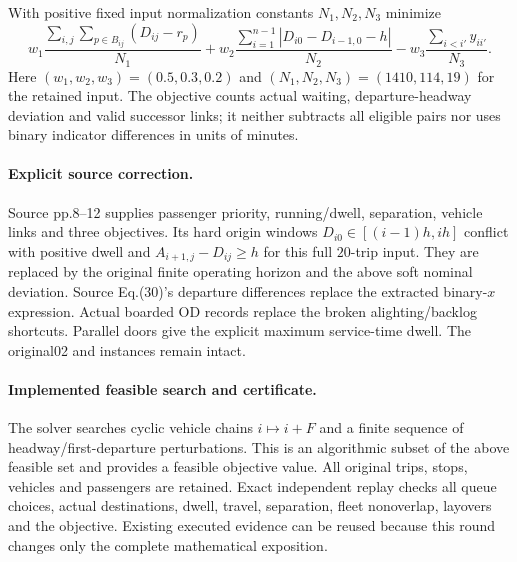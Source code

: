\documentclass[11pt]{article}
\begin{document}
With positive fixed input normalization constants $N_1,N_2,N_3$ minimize
\[
 w_1\frac{\sum_{i,j}\sum_{p\in B_{ij}}(D_{ij}-r_p)}{N_1}
 +w_2\frac{\sum_{i=1}^{n-1}|D_{i0}-D_{i-1,0}-h|}{N_2}
 -w_3\frac{\sum_{i<i'}y_{ii'}}{N_3}.
\]
Here $(w_1,w_2,w_3)=(0.5,0.3,0.2)$ and
$(N_1,N_2,N_3)=(1410,114,19)$ for the retained input.
The objective counts actual waiting, departure-headway deviation and valid
successor links; it neither subtracts all eligible pairs nor uses binary
indicator differences in units of minutes.

\paragraph{Explicit source correction.}
Source pp.8--12 supplies passenger priority, running/dwell, separation,
vehicle links and three objectives. Its hard origin windows
$D_{i0}\in[(i-1)h,ih]$ conflict with positive dwell and
$A_{i+1,j}-D_{ij}\ge h$ for this full $20$-trip input.
They are replaced by the original finite operating horizon and the above soft
nominal deviation. Source Eq.(30)'s departure differences
replace the extracted binary-$x$ expression. Actual boarded OD records replace
the broken alighting/backlog shortcuts. Parallel doors give the explicit
maximum service-time dwell. The original02 and instances remain intact.

\paragraph{Implemented feasible search and certificate.}
The solver searches cyclic vehicle chains $i\mapsto i+F$ and a finite sequence
of headway/first-departure perturbations. This is an algorithmic subset of the
above feasible set and provides a feasible objective value.
All original trips, stops, vehicles and passengers are retained. Exact independent
replay checks all queue choices, actual destinations, dwell, travel, separation,
fleet nonoverlap, layovers and the objective. Existing executed evidence can
be reused because this round changes only the complete mathematical exposition.
\end{document}
